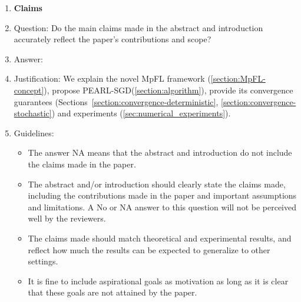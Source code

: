 \documentclass{article}
\newcommand{\algname}[1]{{\color{PineGreen}\sf  #1}\xspace}
\newcommand{\abbvname}{\algname{PEARL-SGD}}
\theoremstyle{plain}
\theoremstyle{remark}
\begin{document}
\begin{enumerate}

\item {\bf Claims}
    \item[] Question: Do the main claims made in the abstract and introduction accurately reflect the paper's contributions and scope?
    \item[] Answer: \answerYes{} %
    \item[] Justification: We explain the novel MpFL framework (\cref{section:MpFL-concept}), propose \abbvname (\cref{section:algorithm}), provide its convergence guarantees (Sections~\ref{section:convergence-deterministic}, \ref{section:convergence-stochastic}) and experiments (\cref{sec:numerical_experiments}).
    \item[] Guidelines:
    \begin{itemize}
        \item The answer NA means that the abstract and introduction do not include the claims made in the paper.
        \item The abstract and/or introduction should clearly state the claims made, including the contributions made in the paper and important assumptions and limitations. A No or NA answer to this question will not be perceived well by the reviewers. 
        \item The claims made should match theoretical and experimental results, and reflect how much the results can be expected to generalize to other settings. 
        \item It is fine to include aspirational goals as motivation as long as it is clear that these goals are not attained by the paper. 
    \end{itemize}


\end{enumerate}
\end{document}
